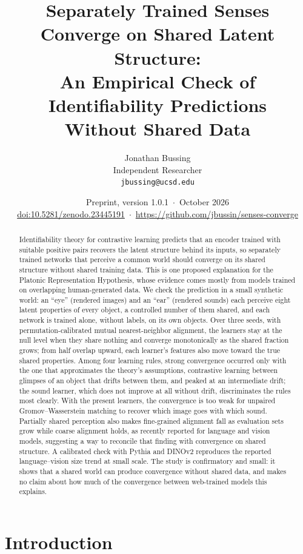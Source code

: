 \documentclass[11pt]{article}
\title{Separately Trained Senses Converge on Shared Latent Structure:\\
An Empirical Check of Identifiability Predictions\\ Without Shared Data}
\author{Jonathan Bussing\\
Independent Researcher\\
\texttt{jbussing@ucsd.edu}}
\date{Preprint, version 1.0.1 \,$\cdot$\, October 2026\\[2pt] \small\href{https://doi.org/10.5281/zenodo.23445191}{doi:10.5281/zenodo.23445191} \,$\cdot$\, \url{https://github.com/jbussin/senses-converge}}
\begin{document}
\maketitle

\begin{abstract}
Identifiability theory for contrastive learning predicts that an encoder trained with suitable positive pairs recovers the latent structure behind its inputs, so separately trained networks that perceive a common world should converge on its shared structure without shared training data. This is one proposed explanation for the Platonic Representation Hypothesis, whose evidence comes mostly from models trained on overlapping human-generated data. We check the prediction in a small synthetic world: an ``eye'' (rendered images) and an ``ear'' (rendered sounds) each perceive eight latent properties of every object, a controlled number of them shared, and each network is trained alone, without labels, on its own objects. Over three seeds, with permutation-calibrated mutual nearest-neighbor alignment, the learners stay at the null level when they share nothing and converge monotonically as the shared fraction grows; from half overlap upward, each learner's features also move toward the true shared properties. Among four learning rules, strong convergence occurred only with the one that approximates the theory's assumptions, contrastive learning between glimpses of an object that drifts between them, and peaked at an intermediate drift; the sound learner, which does not improve at all without drift, discriminates the rules most clearly. With the present learners, the convergence is too weak for unpaired Gromov--Wasserstein matching to recover which image goes with which sound. Partially shared perception also makes fine-grained alignment fall as evaluation sets grow while coarse alignment holds, as recently reported for language and vision models, suggesting a way to reconcile that finding with convergence on shared structure. A calibrated check with Pythia and DINOv2 reproduces the reported language--vision size trend at small scale. The study is confirmatory and small: it shows that a shared world can produce convergence without shared data, and makes no claim about how much of the convergence between web-trained models this explains.
\end{abstract}

\section{Introduction}
\end{document}
